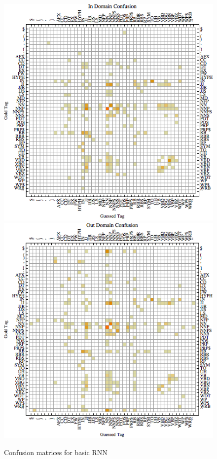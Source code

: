 \documentclass[11pt]{article}
\begin{document}
\begin{figure}
\includegraphics[scale=0.5]{indomain_conf.png} 
\includegraphics[scale=0.5]{outdomain_conf.png} 
\caption{Confusion matrices for basic RNN}\label{Conf_fig}
\end{figure}
\end{document}
